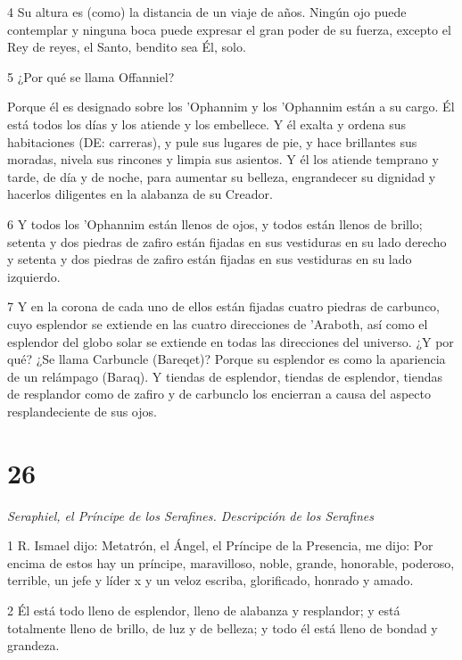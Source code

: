 \par 4 Su altura es (como) la distancia de un viaje de años. Ningún ojo puede contemplar y ninguna boca puede expresar el gran poder de su fuerza, excepto el Rey de reyes, el Santo, bendito sea Él, solo.

\par 5 ¿Por qué se llama Offanniel?

\par Porque él es designado sobre los 'Ophannim y los 'Ophannim están a su cargo. Él está todos los días y los atiende y los embellece. Y él exalta y ordena sus habitaciones (DE: carreras), y pule sus lugares de pie, y hace brillantes sus moradas, nivela sus rincones y limpia sus asientos. Y él los atiende temprano y tarde, de día y de noche, para aumentar su belleza, engrandecer su dignidad y hacerlos diligentes en la alabanza de su Creador.

\par 6 Y todos los 'Ophannim están llenos de ojos, y todos están llenos de brillo; setenta y dos piedras de zafiro están fijadas en sus vestiduras en su lado derecho y setenta y dos piedras de zafiro están fijadas en sus vestiduras en su lado izquierdo.

\par 7 Y en la corona de cada uno de ellos están fijadas cuatro piedras de carbunco, cuyo esplendor se extiende en las cuatro direcciones de 'Araboth, así como el esplendor del globo solar se extiende en todas las direcciones del universo. ¿Y por qué? ¿Se llama Carbuncle (Bareqet)? Porque su esplendor es como la apariencia de un relámpago (Baraq). Y tiendas de esplendor, tiendas de esplendor, tiendas de resplandor como de zafiro y de carbunclo los encierran a causa del aspecto resplandeciente de sus ojos.

\chapter{26}

\par \textit{Seraphiel, el Príncipe de los Serafines. Descripción de los Serafines}

\par 1 R. Ismael dijo: Metatrón, el Ángel, el Príncipe de la Presencia, me dijo: Por encima de estos hay un príncipe, maravilloso, noble, grande, honorable, poderoso, terrible, un jefe y líder x y un veloz escriba, glorificado, honrado y amado.

\par 2 Él está todo lleno de esplendor, lleno de alabanza y resplandor; y está totalmente lleno de brillo, de luz y de belleza; y todo él está lleno de bondad y grandeza.

